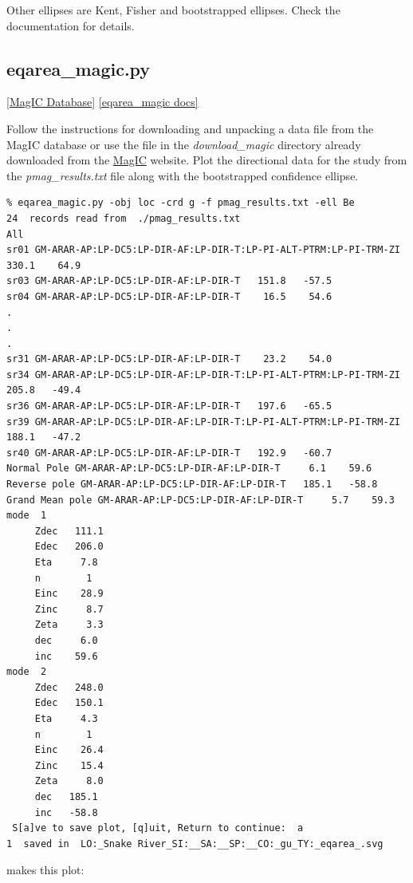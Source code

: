 \documentclass[11pt]{book}
\begin{document}
{{Other ellipses are Kent, Fisher and bootstrapped ellipses.  Check the documentation for details.

\subsection{eqarea\_magic.py} \href{#MagICDatabase}{[MagIC Database]}
\href{https://github.com/PmagPy/PmagPy/blob/master/programs/eqarea_magic.py}{[eqarea\_magic docs]}

Follow the instructions for downloading and unpacking a data file from the MagIC database or use the file in the {\it download\_magic} directory already downloaded from the  \href{http://earthref.org/MagIC/search}{MagIC} website.    Plot the directional data for the study from the {\it pmag\_results.txt} file along with the bootstrapped
 confidence ellipse.

\begin{verbatim}
% eqarea_magic.py -obj loc -crd g -f pmag_results.txt -ell Be
24  records read from  ./pmag_results.txt
All
sr01 GM-ARAR-AP:LP-DC5:LP-DIR-AF:LP-DIR-T:LP-PI-ALT-PTRM:LP-PI-TRM-ZI   330.1    64.9
sr03 GM-ARAR-AP:LP-DC5:LP-DIR-AF:LP-DIR-T   151.8   -57.5
sr04 GM-ARAR-AP:LP-DC5:LP-DIR-AF:LP-DIR-T    16.5    54.6
.
.
.
sr31 GM-ARAR-AP:LP-DC5:LP-DIR-AF:LP-DIR-T    23.2    54.0
sr34 GM-ARAR-AP:LP-DC5:LP-DIR-AF:LP-DIR-T:LP-PI-ALT-PTRM:LP-PI-TRM-ZI   205.8   -49.4
sr36 GM-ARAR-AP:LP-DC5:LP-DIR-AF:LP-DIR-T   197.6   -65.5
sr39 GM-ARAR-AP:LP-DC5:LP-DIR-AF:LP-DIR-T:LP-PI-ALT-PTRM:LP-PI-TRM-ZI   188.1   -47.2
sr40 GM-ARAR-AP:LP-DC5:LP-DIR-AF:LP-DIR-T   192.9   -60.7
Normal Pole GM-ARAR-AP:LP-DC5:LP-DIR-AF:LP-DIR-T     6.1    59.6
Reverse pole GM-ARAR-AP:LP-DC5:LP-DIR-AF:LP-DIR-T   185.1   -58.8
Grand Mean pole GM-ARAR-AP:LP-DC5:LP-DIR-AF:LP-DIR-T     5.7    59.3
mode  1
     Zdec   111.1
     Edec   206.0
     Eta     7.8
     n        1
     Einc    28.9
     Zinc     8.7
     Zeta     3.3
     dec     6.0
     inc    59.6
mode  2
     Zdec   248.0
     Edec   150.1
     Eta     4.3
     n        1
     Einc    26.4
     Zinc    15.4
     Zeta     8.0
     dec   185.1
     inc   -58.8
 S[a]ve to save plot, [q]uit, Return to continue:  a
1  saved in  LO:_Snake River_SI:__SA:__SP:__CO:_gu_TY:_eqarea_.svg
\end{verbatim}

\noindent makes this plot:

}}
\end{document}
